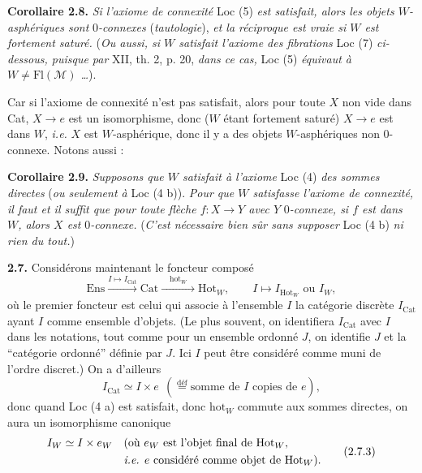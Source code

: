 \textbf{Corollaire 2.8.} \textit{Si l'axiome de connexité} Loc (5) \textit{est satisfait, alors les objets $W$-asphériques sont} 0\textit{-connexes} (\textit{tautologie}), \textit{et la réciproque est vraie si $W$ est fortement saturé.} (\textit{Ou aussi, si $W$ satisfait l'axiome des fibrations} Loc (7) \textit{ci-dessous, puisque par} XII, th. 2, p. 20, \textit{dans ce cas,} Loc (5) \textit{équivaut à $W \neq \mathrm{Fl}(\mathcal{M})$ \ldots}).

Car si l'axiome de connexité n'est pas satisfait, alors pour toute $X$ non vide dans Cat, $X \longrightarrow e$ est un isomorphisme, donc ($W$ étant fortement saturé) $X \longrightarrow e$ est dans $W$, \textit{i.e.} $X$ est $W$-asphérique, donc il y a des objets $W$-asphériques non 0-connexe. Notons aussi : %

\textbf{Corollaire 2.9.} \textit{Supposons que $W$ satisfait à l'axiome} Loc (4) \textit{des sommes directes} (\textit{ou seulement à} Loc (4 b)). \textit{Pour que $W$ satisfasse l'axiome de connexité, il faut et il suffit que pour toute flèche $f : X \longrightarrow Y$ avec $Y$} 0\textit{-connexe, si $f$ est dans $W$, alors $X$ est} 0\textit{-connexe.} (\textit{C'est nécessaire bien sûr sans supposer} Loc (4 b) \textit{ni rien du tout.})


\textbf{2.7.} Considérons maintenant le foncteur composé
\[
\mathrm{Ens} \xrightarrow{I \longmapsto I_{\mathrm{Cat}}} \mathrm{Cat} \xrightarrow{\quad \mathrm{hot}_W \quad} \mathrm{Hot}_W, \qquad I \longmapsto I_{\mathrm{Hot}_W} \text{ ou } I_W, \tag*{(2.7.1)}
\]
où le premier foncteur est celui qui associe à l'ensemble $I$ la catégorie discrète $I_{\mathrm{Cat}}$ ayant $I$ comme ensemble d'objets. (Le plus souvent, on identifiera $I_{\mathrm{Cat}}$ avec $I$ dans les notations, tout comme pour un ensemble ordonné $J$, on identifie $J$ et la “catégorie ordonné” %
définie par $J$. Ici $I$ peut être considéré comme muni de l'ordre discret.) On a d'ailleurs
\[
I_{\mathrm{Cat}} \simeq I \times e \ \ (\overset{\text{déf}}{=} \text{somme de $I$ copies de $e$}), \tag*{(2.7.2)}
\]
donc quand Loc (4 a) est satisfait, donc $\mathrm{hot}_W$ commute aux sommes directes, on aura un isomorphisme canonique
\[
\begin{aligned}
I_W \simeq I \times e_W \quad &\text{(où $e_W$ est l'objet final de $\mathrm{Hot}_W$,} \\
&\text{\textit{i.e.} $e$ considéré comme objet de $\mathrm{Hot}_W$).}
\end{aligned} \tag*{(2.7.3)}
\]


